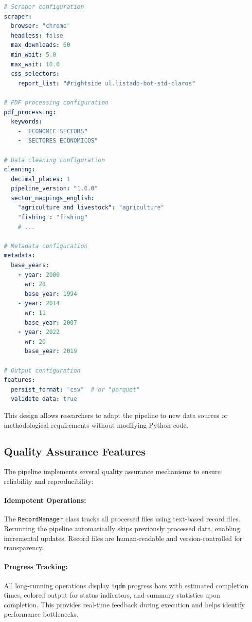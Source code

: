 \documentclass[a4paper, fleqn, 11pt]{article}
\newcommand{\pymodule}[1]{\texttt{#1}}
\begin{document}
\begin{lstlisting}[language=yaml, caption={Configuration file excerpt (config/config.yaml)}]
# Scraper configuration
scraper:
  browser: "chrome"
  headless: false
  max_downloads: 60
  min_wait: 5.0
  max_wait: 10.0
  css_selectors:
    report_list: "#rightside ul.listado-bot-std-claros"

# PDF processing configuration
pdf_processing:
  keywords:
    - "ECONOMIC SECTORS"
    - "SECTORES ECONOMICOS"

# Data cleaning configuration
cleaning:
  decimal_places: 1
  pipeline_version: "1.0.0"
  sector_mappings_english:
    "agriculture and livestock": "agriculture"
    "fishing": "fishing"
    # ...

# Metadata configuration
metadata:
  base_years:
    - year: 2000
      wr: 28
      base_year: 1994
    - year: 2014
      wr: 11
      base_year: 2007
    - year: 2022
      wr: 20
      base_year: 2019

# Output configuration
features:
  persist_format: "csv"  # or "parquet"
  validate_data: true
\end{lstlisting}

This design allows researchers to adapt the pipeline to new data sources or methodological requirements without modifying Python code.

\subsection{Quality Assurance Features}

The pipeline implements several quality assurance mechanisms to ensure reliability and reproducibility:

\paragraph{Idempotent Operations:} The \pymodule{RecordManager} class tracks all processed files using text-based record files. Rerunning the pipeline automatically skips previously processed data, enabling incremental updates. Record files are human-readable and version-controlled for transparency.

\paragraph{Progress Tracking:} All long-running operations display \texttt{tqdm} progress bars with estimated completion times, colored output for status indicators, and summary statistics upon completion. This provides real-time feedback during execution and helps identify performance bottlenecks.
\end{document}
